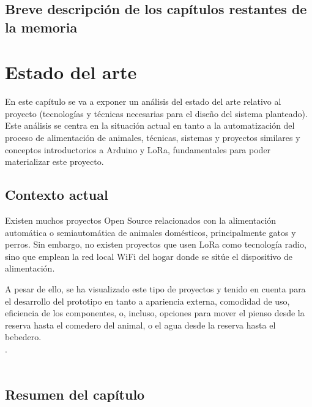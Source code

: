 \documentclass[12pt]{article}
\begin{document}
	\subsection[Breve descripción de los capítulos restantes de la memoria]{Breve descripción de los capítulos restantes de la memoria}
	
	\pagebreak
	

	\section[Estado del arte]{Estado del arte}  
	
	\noindent En este capítulo se va a exponer un análisis del estado del arte relativo al proyecto (tecnologías y técnicas necesarias para el diseño del sistema planteado). Este análisis se centra en la situación actual en tanto a  la automatización del proceso de alimentación de animales, técnicas, sistemas y proyectos similares y conceptos introductorios a Arduino y LoRa, fundamentales para poder materializar este proyecto.
	
	\subsection[Contexto actual]{Contexto actual}
	
		\noindent Existen muchos proyectos Open Source relacionados con la alimentación automática o semiautomática de animales domésticos, principalmente gatos y perros. Sin embargo, no existen proyectos que usen LoRa como tecnología radio, sino que emplean la red local WiFi del hogar donde se sitúe el dispositivo de alimentación.
	
	\noindent A pesar de ello, se ha visualizado este tipo de proyectos y tenido en cuenta para el desarrollo del prototipo en tanto a apariencia externa, comodidad de uso, eficiencia de los componentes, o, incluso, opciones para mover el pienso desde la reserva hasta el comedero del animal, o el agua desde la reserva hasta el bebedero. \\
	
	. \\
	
	 \\
	

	\subsection[Resumen del capítulo]{Resumen del capítulo}
	
\end{document}
